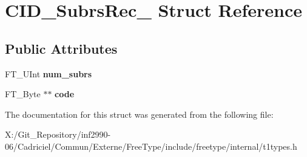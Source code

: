 \hypertarget{struct_c_i_d___subrs_rec__}{\section{C\-I\-D\-\_\-\-Subrs\-Rec\-\_\- Struct Reference}
\label{struct_c_i_d___subrs_rec__}
}
\subsection*{Public Attributes}
\begin{DoxyCompactItemize}
\item 
\hypertarget{struct_c_i_d___subrs_rec___a3abd23388e2e0f4888f826a993953c7e}{F\-T\-\_\-\-U\-Int {\bfseries num\-\_\-subrs}}\label{struct_c_i_d___subrs_rec___a3abd23388e2e0f4888f826a993953c7e}

\item 
\hypertarget{struct_c_i_d___subrs_rec___a1a4f0a4e514492fccaf81d7ede6c4e08}{F\-T\-\_\-\-Byte $\ast$$\ast$ {\bfseries code}}\label{struct_c_i_d___subrs_rec___a1a4f0a4e514492fccaf81d7ede6c4e08}

\end{DoxyCompactItemize}


The documentation for this struct was generated from the following file\-:\begin{DoxyCompactItemize}
\item 
X\-:/\-Git\-\_\-\-Repository/inf2990-\/06/\-Cadriciel/\-Commun/\-Externe/\-Free\-Type/include/freetype/internal/t1types.\-h\end{DoxyCompactItemize}
